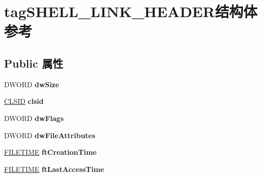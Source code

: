 \hypertarget{structtag_s_h_e_l_l___l_i_n_k___h_e_a_d_e_r}{}\section{tag\+S\+H\+E\+L\+L\+\_\+\+L\+I\+N\+K\+\_\+\+H\+E\+A\+D\+E\+R结构体 参考}
\label{structtag_s_h_e_l_l___l_i_n_k___h_e_a_d_e_r}
\subsection*{Public 属性}
\begin{DoxyCompactItemize}
\item 
\mbox{\label{structtag_s_h_e_l_l___l_i_n_k___h_e_a_d_e_r_ae0bc0ddba3996cd095f8191c4919b06a}} 
D\+W\+O\+RD {\bfseries dw\+Size}
\item 
\mbox{\label{structtag_s_h_e_l_l___l_i_n_k___h_e_a_d_e_r_a42410f2952a781b4339b2e1544505197}} 
\hyperlink{struct___i_i_d}{C\+L\+S\+ID} {\bfseries clsid}
\item 
\mbox{\label{structtag_s_h_e_l_l___l_i_n_k___h_e_a_d_e_r_acb8407c458562b8d3813ebbf62830811}} 
D\+W\+O\+RD {\bfseries dw\+Flags}
\item 
\mbox{\label{structtag_s_h_e_l_l___l_i_n_k___h_e_a_d_e_r_a32a9a8f9a4faac305abcee0db10ee5b7}} 
D\+W\+O\+RD {\bfseries dw\+File\+Attributes}
\item 
\mbox{\label{structtag_s_h_e_l_l___l_i_n_k___h_e_a_d_e_r_a851932a0d2acf6c65a23166f44e6427d}} 
\hyperlink{struct___f_i_l_e_t_i_m_e}{F\+I\+L\+E\+T\+I\+ME} {\bfseries ft\+Creation\+Time}
\item 
\mbox{\label{structtag_s_h_e_l_l___l_i_n_k___h_e_a_d_e_r_a23df2b0f1a65a24063ef5729396f27e1}} 
\hyperlink{struct___f_i_l_e_t_i_m_e}{F\+I\+L\+E\+T\+I\+ME} {\bfseries ft\+Last\+Access\+Time}
\item 
\mbox{\label{structtag_s_h_e_l_l___l_i_n_k___h_e_a_d_e_r_ac4c2359d9c4b939dbb7ad143afc7ab6a}} 

\end{DoxyCompactItemize}
